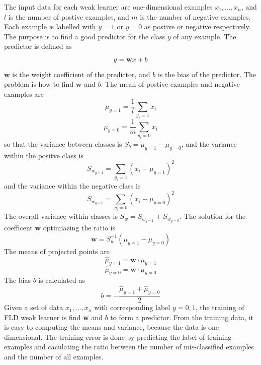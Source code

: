 The input data for each weak learner are one-dimensional examples $x_{1},\ldots, x_{n}$, and $l$ is the number of postive examples, and $m$ is the number of negative examples. Each example is labelled with $y=1$ or $y=0$ as postive or negative respectively. The purpose is to find a good predictor for the class $y$ of any example. The predictor is defined as
\begin{equation}
 y= \textbf{\textrm{w}}x + b
\end{equation}
$\textbf{w}$ is the weight coefficient of the predictor, and $b$ is the bias of the predictor. The problem is how to find $\textbf{w}$ and $b$. The mean of postive examples and negative examples are
\begin{equation}
 \mu_{y=1}=\frac{1}{l}\sum_{y_{i}=1}x_{i}
\end{equation}
\begin{equation}
 \mu_{y=0}=\frac{1}{m}\sum_{y_{i}=0}x_{i}
\end{equation}
so that the variance between classes is $S_{b}=\mu_{y=1}-\mu_{y=0}$, and the variance within the positve class is
\begin{equation}
 S_{w_{y=1}}=\sum_{y_{i}=1} (x_{i}-\mu_{y=1})^2
\end{equation}
and the variance within the negative class is 
\begin{equation}
 S_{w_{y=0}}=\sum_{y_{i}=0} (x_{i}-\mu_{y=0})^2
\end{equation}
The overall variance within classes is $S_{w}=S_{w_{y=1}}+S_{w_{y=0}}$. The solution for the coefficent $\textbf{w}$ optimiazing the ratio is 
\begin{equation}
 \textbf{w}= S_{w}^{-1}(\mu_{y=1}-\mu_{y=0})
\end{equation}
The means of projected points are 
\begin{equation}
 \widehat{\mu}_{y=1}=\textbf{w}\cdot\mu_{y=1}
\end{equation}
\begin{equation}
 \widehat{\mu}_{y=0}=\textbf{w}\cdot\mu_{y=0}
\end{equation}
The bias $b$ is calculated as
\begin{equation}
 b=-\frac{\widehat{\mu}_{y=1}+\widehat{\mu}_{y=0}}{2}
\end{equation}
Given a set of data $x_{1},\ldots, x_{n}$ with corresponding label $y=0,1$, the training of FLD weak learner is find  \textbf{w} and $b$ to form a predictor. From the training data, it is easy to computing the means and variance, because the data is one-dimensional. The training error is done by predicting the label of training examples and caculating the ratio between the number of mis-classified examples and the number of all examples.

